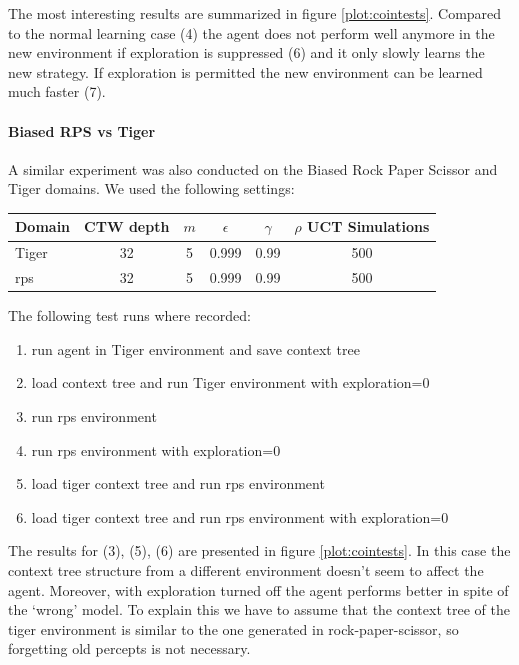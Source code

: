 \documentclass[paper=a4, fontsize=11pt]{scrartcl} %
\numberwithin{equation}{section} %
\numberwithin{figure}{section} %
\numberwithin{table}{section} %
\begin{document}
The most interesting results are summarized in figure \ref{plot:cointests}.  Compared to the normal learning case (4) the agent does not perform well anymore in the new environment if exploration is suppressed (6) and it only slowly learns the new strategy. If exploration is permitted the new environment can be learned much faster (7).

\paragraph{Biased RPS vs Tiger}
A similar experiment was also conducted on the Biased Rock Paper Scissor and Tiger domains. We used the following settings:

\bigskip

\begin{tabular}{|l|c|c|c|c|c|}
\hline
Domain & CTW depth & $m$ & $\epsilon$ &$\gamma $ & $\rho$ UCT Simulations\\\hline
Tiger & 32 & 5 & 0.999 & 0.99 & 500\\
rps & 32 & 5 & 0.999 & 0.99 & 500\\\hline
\end{tabular}

\bigskip

The following test runs where recorded:
\begin{enumerate}
 \setlength{\itemsep}{0cm}%
  \setlength{\parskip}{0cm}%
\item run agent in Tiger environment and save context tree
\item load context tree and run Tiger environment with exploration=0
\item run rps environment
\item run rps environment with exploration=0
\item load tiger context tree and run rps environment 
\item load tiger context tree and run rps environment with exploration=0
\end{enumerate}

The results for (3), (5), (6) are presented in figure \ref{plot:cointests}. In this case the context tree structure from a different environment doesn't seem to affect the agent. Moreover, with exploration turned off the agent performs better in spite of the `wrong' model. To explain this we have to assume that the context tree of the tiger environment is similar to the one generated in rock-paper-scissor, so forgetting old percepts is not necessary. 
\end{document}
